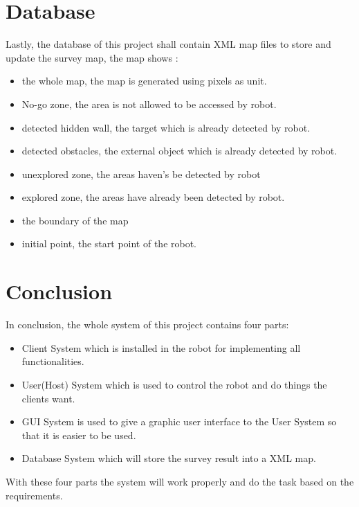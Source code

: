 \documentclass[11pt, a4paper]{report}
\begin{document}
\section{Database}
Lastly, the database of this project shall contain XML map files to store and update the survey map, the map shows :
\begin{itemize}
  \item the whole map, the map is generated using pixels as unit.
  \item No-go zone, the area is not allowed to be accessed by robot.
  \item detected hidden wall, the target which is already detected by robot.
  \item detected obstacles, the external object which is already detected by robot.
  \item unexplored zone, the areas haven's be detected by robot
  \item explored zone, the areas have already been detected by robot.
  \item the boundary of the map
  \item initial point, the start point of the robot. 
\end{itemize}
\par\vspace{\baselineskip}
\par\vspace{\baselineskip}
\section{Conclusion}
In conclusion, the whole system of this project contains four parts:
\begin{itemize}
  \item Client System which is installed in the robot for implementing all functionalities.
  \item User(Host) System which is used to control the robot and do things the clients want.
  \item GUI System is used to give a graphic user interface to the User System so that it is easier to be used.
  \item Database System which will store the survey result into a XML map.
\end{itemize}
With these four parts the system will work properly and do the task based on the requirements.



\pagebreak
\end{document}

